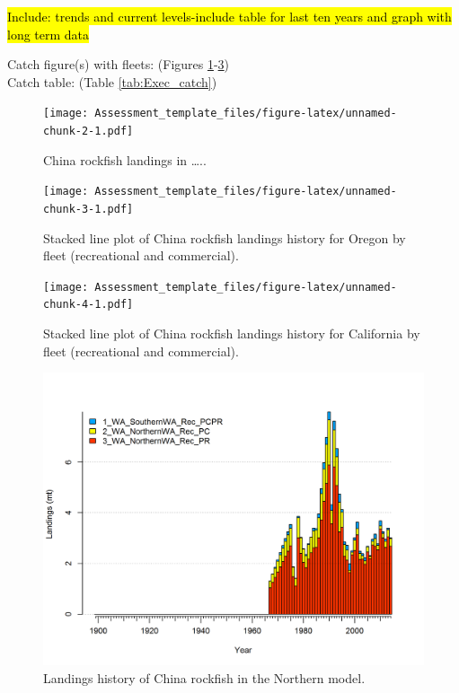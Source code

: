 \documentclass[12pt,]{article}
\begin{document}
\hl{Include: trends and current levels-include table for last ten years and graph with 
long term data}

Catch figure(s) with fleets: (Figures
\ref{fig:Exec_catch1}-\ref{fig:Exec_catch3})\\
Catch table: (Table \ref{tab:Exec_catch})

\FloatBarrier

\begin{figure}[htbp]
\centering
\texttt{[image: Assessment\_template\_files/figure-latex/unnamed-chunk-2-1.pdf]}
\caption{China rockfish landings in \ldots{}.. \label{fig:Exec_catch1}}
\end{figure}

\begin{figure}[htbp]
\centering
\texttt{[image: Assessment\_template\_files/figure-latex/unnamed-chunk-3-1.pdf]}
\caption{Stacked line plot of China rockfish landings history for Oregon
by fleet (recreational and commercial). \label{fig:Exec_catch2}}
\end{figure}

\begin{figure}[htbp]
\centering
\texttt{[image: Assessment\_template\_files/figure-latex/unnamed-chunk-4-1.pdf]}
\caption{Stacked line plot of China rockfish landings history for
California by fleet (recreational and commercial).
\label{fig:Exec_catch3}}
\end{figure}

\FloatBarrier

\begin{figure}[htbp]
\centering
\includegraphics{r4ss/plots_mod1/catch2 landings stacked.png}
\caption{Landings history of China rockfish in the Northern model.
\label{fig:r4ss_catches}}
\end{figure}
\end{document}
